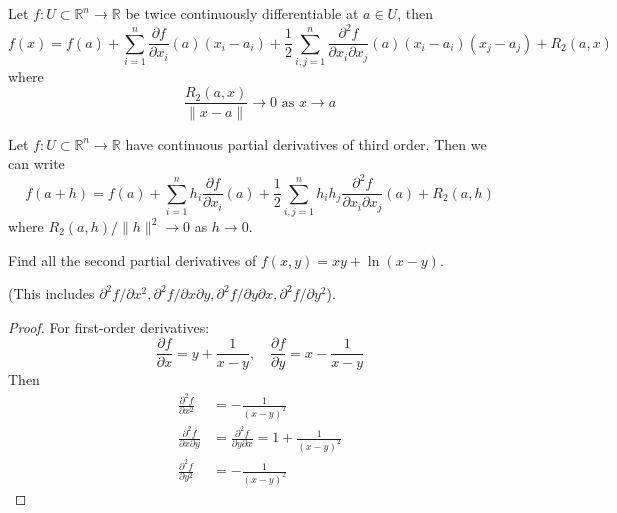 \documentclass[openany]{book}
\newcommand{\R}{\mathbb{R}}
\begin{document}
\begin{defn}\label{taylor}
    Let $f:U\subset\R^n\to\R$ be twice continuously differentiable at $a\in U$, then 
    \begin{equation*}
        f(x)=f(a)+\sum_{i=1}^n\frac{\partial f}{\partial x_i}(a)(x_i-a_i)+\frac{1}{2}\sum_{i,j=1}^n\frac{\partial^2 f}{\partial x_i\partial x_j}(a)(x_i-a_i)(x_j-a_j)+R_2(a,x)
    \end{equation*}
    where 
    \begin{equation*}
        \frac{R_2(a,x)}{\|x-a\|}\to 0 \text{ as } x\to a
    \end{equation*}
\end{defn}


\begin{defn}
    Let $f:U\subset\R^n\to\R$ have continuous partial derivatives of third order. Then we can write 
    \begin{equation*}
        f(a+h)=f(a)+\sum_{i=1}^nh_i\frac{\partial f}{\partial x_i}(a)+\frac{1}{2}\sum_{i,j=1}^nh_ih_j\frac{\partial^2f}{\partial x_i\partial x_j}(a)+R_2(a,h)
    \end{equation*}
    where $R_2(a,h)/\|h\|^2\to 0$ as $h\to 0$.
\end{defn}










\begin{prob}
    Find all the second partial derivatives of $f(x,y)=xy+\ln(x-y)$.

    \noindent
    (This includes $\partial^2f/\partial x^2, \partial^2 f/\partial x\partial y, \partial^2f/\partial y\partial x, \partial^2 f/\partial y^2$).
\end{prob}
\begin{proof}
    For first-order derivatives:
    \begin{equation*}
        \frac{\partial f}{\partial x}=y+\frac{1}{x-y}, \quad \frac{\partial f}{\partial y}=x-\frac{1}{x-y}
    \end{equation*}
    Then 
    \begin{align*}
        \frac{\partial^2f}{\partial x^2}&=-\frac{1}{(x-y)^2}\\
        \frac{\partial^2 f}{\partial x\partial y}&=\frac{\partial^2 f}{\partial y\partial x}=1+\frac{1}{(x-y)^2}\\
        \frac{\partial^2f}{\partial y^2}&=-\frac{1}{(x-y)^2}
    \end{align*}
\end{proof}
\end{document}
